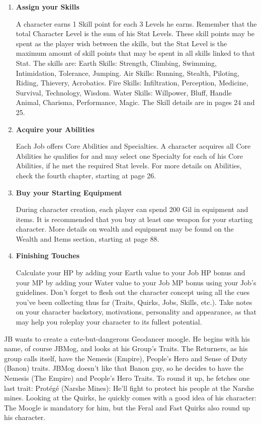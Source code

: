 \begin{multicols}{2}
\begin{enumerate}
\item \textbf{Assign your Skills}

A character earns 1 Skill point for each 3 Levels he
earns. Remember that the total Character Level is
the sum of his Stat Levels. These skill points may
be spent as the player wish between the skills, but
the Stat Level is the maximum amount of skill
points that may be spent in all skills linked to that
Stat. The skills are:
Earth Skills: Strength, Climbing, Swimming,
Intimidation, Tolerance, Jumping.
Air Skills: Running, Stealth, Piloting, Riding,
Thievery, Acrobatics.
Fire Skills: Infiltration, Perception, Medicine,
Survival, Technology, Wisdom.
Water Skills: Willpower, Bluff, Handle Animal,
Charisma, Performance, Magic.
The Skill details are in pages 24 and 25.

\item \textbf{Acquire your Abilities}

Each Job offers Core Abilities and Specialties. A
character acquires all Core Abilities he qualifies for
and may select one Specialty for each of his Core
Abilities, if he met the required Stat levels. For
more details on Abilities, check the fourth chapter,
starting at page 26.

\item \textbf{Buy your Starting Equipment}

During character creation, each player can
spend 200 Gil in equipment and items. It is
recommended that you buy at least one weapon
for your starting character. More details on wealth
and equipment may be found on the Wealth and
Items section, starting at page 88.

\item \textbf{Finishing Touches}

Calculate your HP by adding your Earth value
to your Job HP bonus and your MP by adding your
Water value to your Job MP bonus using your Job's
guidelines. Don't forget to flesh out the character
concept using all the cues you've been collecting
thus far (Traits, Quirks, Jobs, Skills, etc.). Take
notes on your character backstory, motivations,
personality and appearance, as that may help you
roleplay your character to its fullest potential.

\end{enumerate}

\begin{mog}
JB wants to create a cute-but-dangerous Geodancer
moogle. He begins with his name, of course JBMog, and
looks at his Group's Traits. The Returners, as his group
calls itself, have the Nemesis (Empire), People's Hero and
Sense of Duty (Banon) traits. JBMog doesn't like that
Banon guy, so he decides to have the Nemesis (The
Empire) and People's Hero Traits. To round it up, he
fetches one last trait: Protégé (Narshe Mines): He'll fight
to protect his people at the Narshe mines.
Looking at the Quirks, he quickly comes with a
good idea of his character: The Moogle is mandatory for
him, but the Feral and Fast Quirks also round up his
character.


\end{mog}
\end{multicols}
